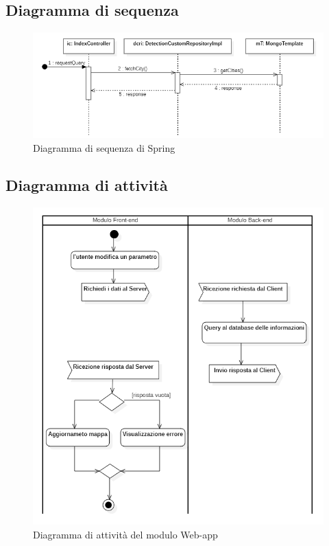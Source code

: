 \subsection{Diagramma di sequenza}\label{ArchitetturaModuloWebAppDiagrammaDiSequenza}
\begin{figure}[H]
  \begin{center}
    \includegraphics[scale=0.8]{../immagini/diag_PB/diag_seq_spring.png}
    \caption{Diagramma di sequenza di Spring}
  \end{center}
\end{figure}

\subsection{Diagramma di attività}\label{ArchitetturaModuloWebAppDiagrammaDiAttività}
\begin{figure}[H]
  \begin{center}
    \includegraphics[scale=0.8]{../immagini/diag_PB/diag_act_front_back.png}
    \caption{Diagramma di attività del modulo Web-app}
  \end{center}
\end{figure}

